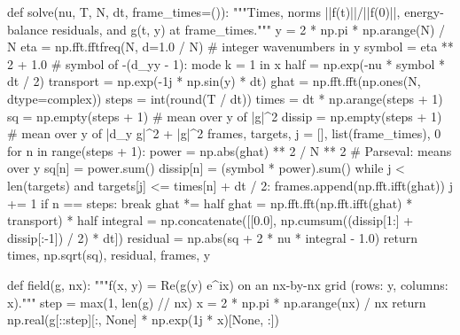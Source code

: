 \documentclass[11pt]{article}
\makeatletter
\theoremstyle{definition}
\theoremstyle{remark}
\newenvironment{note}[1][Note]{\begin{tcolorbox}[ed@note]\noindent{\itshape#1\@addpunct{.}}\enspace\ignorespaces}{\end{tcolorbox}}
\makeatother
\begin{document}
\begin{note}[Code]
\begin{wikicode}[python]
def solve(nu, T, N, dt, frame_times=()):
    """Times, norms ||f(t)||/||f(0)||, energy-balance residuals, and g(t, y) at frame_times."""
    y = 2 * np.pi * np.arange(N) / N
    eta = np.fft.fftfreq(N, d=1.0 / N)              # integer wavenumbers in y
    symbol = eta ** 2 + 1.0                          # symbol of -(d_yy - 1): mode k = 1 in x
    half = np.exp(-nu * symbol * dt / 2)
    transport = np.exp(-1j * np.sin(y) * dt)
    ghat = np.fft.fft(np.ones(N, dtype=complex))
    steps = int(round(T / dt))
    times = dt * np.arange(steps + 1)
    sq = np.empty(steps + 1)                         # mean over y of |g|^2
    dissip = np.empty(steps + 1)                     # mean over y of |d_y g|^2 + |g|^2
    frames, targets, j = [], list(frame_times), 0
    for n in range(steps + 1):
        power = np.abs(ghat) ** 2 / N ** 2           # Parseval: means over y
        sq[n] = power.sum()
        dissip[n] = (symbol * power).sum()
        while j < len(targets) and targets[j] <= times[n] + dt / 2:
            frames.append(np.fft.ifft(ghat))
            j += 1
        if n == steps:
            break
        ghat *= half
        ghat = np.fft.fft(np.fft.ifft(ghat) * transport) * half
    integral = np.concatenate([[0.0], np.cumsum((dissip[1:] + dissip[:-1]) / 2) * dt])
    residual = np.abs(sq + 2 * nu * integral - 1.0)
    return times, np.sqrt(sq), residual, frames, y


def field(g, nx):
    """f(x, y) = Re(g(y) e^{ix}) on an nx-by-nx grid (rows: y, columns: x)."""
    step = max(1, len(g) // nx)
    x = 2 * np.pi * np.arange(nx) / nx
    return np.real(g[::step][:, None] * np.exp(1j * x)[None, :])



\end{wikicode}
\end{note}
\end{document}
